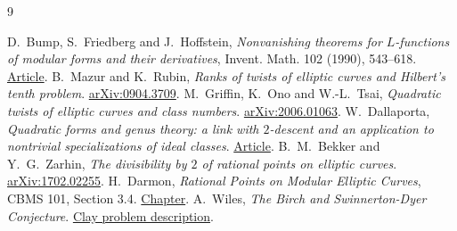 \documentclass[11pt]{article}
\begin{document}
\begin{thebibliography}{9}\raggedright
{} D.~Bump, S.~Friedberg and J.~Hoffstein,
\emph{Nonvanishing theorems for $L$-functions of modular forms and
their derivatives}, Invent. Math. 102 (1990), 543--618.
\href{https://wstein.org/papers/bib/bump-friedberg-hoffstein-nonvanishing.pdf}{Article}.
 B.~Mazur and K.~Rubin, \emph{Ranks of twists of elliptic
curves and Hilbert's tenth problem}.
\href{https://arxiv.org/abs/0904.3709}{arXiv:0904.3709}.
 M.~Griffin, K.~Ono and W.-L.~Tsai, \emph{Quadratic
twists of elliptic curves and class numbers}.
\href{https://arxiv.org/abs/2006.01063}{arXiv:2006.01063}.
 W.~Dallaporta, \emph{Quadratic forms and genus theory:
a link with $2$-descent and an application to nontrivial specializations
of ideal classes}. \href{https://doi.org/10.1112/jlms.12921}{Article}.
 B.~M.~Bekker and Y.~G.~Zarhin, \emph{The divisibility
by $2$ of rational points on elliptic curves}.
\href{https://arxiv.org/abs/1702.02255}{arXiv:1702.02255}.
 H.~Darmon, \emph{Rational Points on Modular Elliptic
Curves}, CBMS 101, Section 3.4.
\href{https://www.math.mcgill.ca/darmon/pub/Articles/Research/36.NSF-CBMS/chapter.pdf}{Chapter}.
 A.~Wiles, \emph{The Birch and Swinnerton-Dyer Conjecture}.
\href{https://www.claymath.org/wp-content/uploads/2022/05/birchswin.pdf}{Clay problem description}.
\end{thebibliography}
\end{document}
